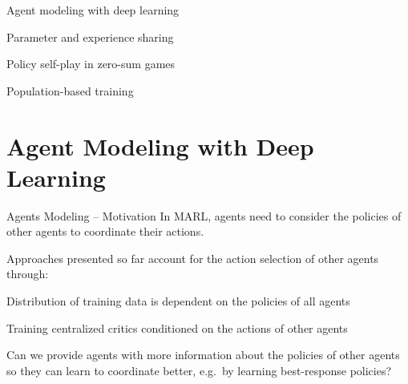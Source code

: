 

\otherslide

\subtitle{Multi-Agent Deep Reinforcement Learning -- Part 2}


\maketitle

\introslide

\begin{frame}{\outline}

\blist
    \item Agent modeling with deep learning
    \item Parameter and experience sharing
    \item Policy self-play in zero-sum games
    \item Population-based training
\elist
\end{frame}

\section{Agent Modeling with Deep Learning}

\begin{frame}[t]{Agents Modeling -- Motivation}
    In MARL, agents need to consider the policies of other agents to coordinate their actions.

    \pause

    Approaches presented so far account for the action selection of other agents through:
    \blist
        \item Distribution of training data is dependent on the policies of all agents
        \item Training centralized critics conditioned on the actions of other agents
    \elist

    \pause

    \begin{redbox}
        Can we provide agents with more  information about the policies of other agents so they can learn to coordinate better, e.g.\ by learning best-response policies?
    \end{redbox}
\end{frame}

